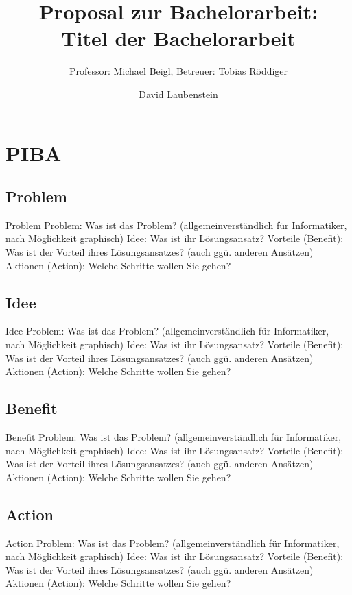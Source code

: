 \documentclass[18pt]{beamer}
\title[Proposal Bachelorarbeit]{Proposal zur Bachelorarbeit:\\ Titel der Bachelorarbeit}
\subtitle{Professor: Michael Beigl, Betreuer: Tobias Röddiger}
\author{David Laubenstein}
\institute{Lehrstuhl Pervasive Computing Systems}
\begin{document}

\begin{frame}
\titlepage
\end{frame}


\section{PIBA}
\subsection{Problem}
\begin{frame}{Problem}
Problem: Was ist das Problem? (allgemeinverständlich für Informatiker, nach Möglichkeit graphisch)
Idee: Was ist ihr Lösungsansatz?
Vorteile (Benefit): Was ist der Vorteil ihres Lösungsansatzes? (auch ggü. anderen Ansätzen)
Aktionen (Action): Welche Schritte wollen Sie gehen?
\end{frame}

\subsection{Idee}
\begin{frame}{Idee}
Problem: Was ist das Problem? (allgemeinverständlich für Informatiker, nach Möglichkeit graphisch)
Idee: Was ist ihr Lösungsansatz?
Vorteile (Benefit): Was ist der Vorteil ihres Lösungsansatzes? (auch ggü. anderen Ansätzen)
Aktionen (Action): Welche Schritte wollen Sie gehen?
\end{frame}

\subsection{Benefit}
\begin{frame}{Benefit}
Problem: Was ist das Problem? (allgemeinverständlich für Informatiker, nach Möglichkeit graphisch)
Idee: Was ist ihr Lösungsansatz?
Vorteile (Benefit): Was ist der Vorteil ihres Lösungsansatzes? (auch ggü. anderen Ansätzen)
Aktionen (Action): Welche Schritte wollen Sie gehen?
\end{frame}

\subsection{Action}
\begin{frame}{Action}
Problem: Was ist das Problem? (allgemeinverständlich für Informatiker, nach Möglichkeit graphisch)
Idee: Was ist ihr Lösungsansatz?
Vorteile (Benefit): Was ist der Vorteil ihres Lösungsansatzes? (auch ggü. anderen Ansätzen)
Aktionen (Action): Welche Schritte wollen Sie gehen?
\end{frame}
\end{document}
